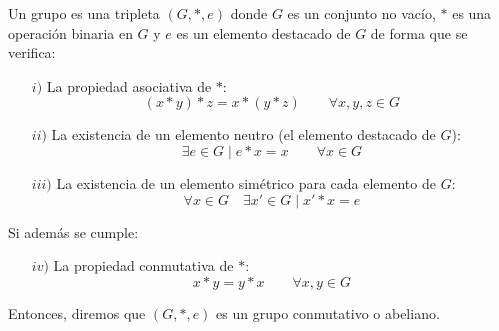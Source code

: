 \begin{definicion}[Grupo]
    Un grupo es una tripleta $(G,\ast,e)$ donde $G$ es un conjunto no vacío, $\ast$ es una operación binaria en $G$ y $e$ es un elemento destacado de $G$ de forma que se verifica:
    \begin{enumerate}
        \item[$i)$] La propiedad asociativa de $\ast$:
            \begin{equation*}
                (x\ast y) \ast z = x \ast (y\ast z) \qquad \forall x,y,z\in G
            \end{equation*}
        \item[$ii)$] La existencia de un elemento neutro (el elemento destacado de $G$):
            \begin{equation*}
                \exists e\in G \mid e\ast x = x \qquad \forall x\in G
            \end{equation*}
        \item[$iii)$] La existencia de un elemento simétrico para cada elemento de $G$:
            \begin{equation*}
                \forall x\in G \quad \exists x'\in G\mid x'\ast x = e
            \end{equation*}
    \end{enumerate}
    Si además se cumple:
    \begin{enumerate}
        \item[$iv)$] La propiedad conmutativa de $\ast$: 
            \begin{equation*}
                x\ast y = y \ast x \qquad \forall x,y\in G
            \end{equation*}
    \end{enumerate}
    Entonces, diremos que $(G,\ast,e)$ es un grupo conmutativo o abeliano.
\end{definicion}

